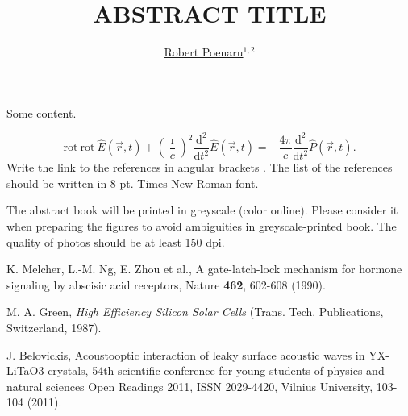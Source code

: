 ﻿\documentclass[a4paper,10pt,english]{article}
\begin{document}
\title{ABSTRACT TITLE}


\author{\uline{Robert Poenaru}$^{1,2}$}

\maketitle

\address{$^{1}$Department of Theoretical Physics, Horia Hulubei National Institute of Physics and Nuclear Engineering, Magurele, Romania}


\address{$^{2}$Doctoral School of Physics, University of Bucharest, Bucharest, Romania}



Some content.

\begin{equation}
\mathrm{rot}\:\mathrm{rot}\:\hat{E}(\vec{r},t)+\left(\frac{\imath}{c}\right)^{2}\frac{\mathrm{d}^{2}}{\mathrm{d}t^{2}}\hat{E}(\vec{r},t)=-\frac{4\pi}{c}\frac{\mathrm{d}^{2}}{\mathrm{d}t^{2}}\hat{P}(\vec{r},t).\label{eq:Maxwell}
\end{equation}
Write the link to the references in angular brackets \cite{key-1}. The list of the references should be written in 8 pt. Times New Roman font. 

The abstract book will be printed in greyscale (color online). Please consider it when preparing the figures to avoid ambiguities in greyscale-printed book. The quality of photos should be at least 150 dpi.

\begin{thebibliography}{References}

K. Melcher, L.-M. Ng, E. Zhou et al., A gate-latch-lock
mechanism for hormone signaling by abscisic acid receptors, Nature
\textbf{462}, 602-608 (1990).

M. A. Green, \textit{High Efficiency Silicon Solar
Cells} (Trans. Tech. Publications, Switzerland, 1987).

J. Belovickis, Acoustooptic interaction of leaky surface
acoustic waves in YX-LiTaO3 crystals, 54th scientific conference for
young students of physics and natural sciences Open Readings 2011,
ISSN 2029-4420, Vilnius University, 103-104 (2011).\end{thebibliography}
\end{document}
